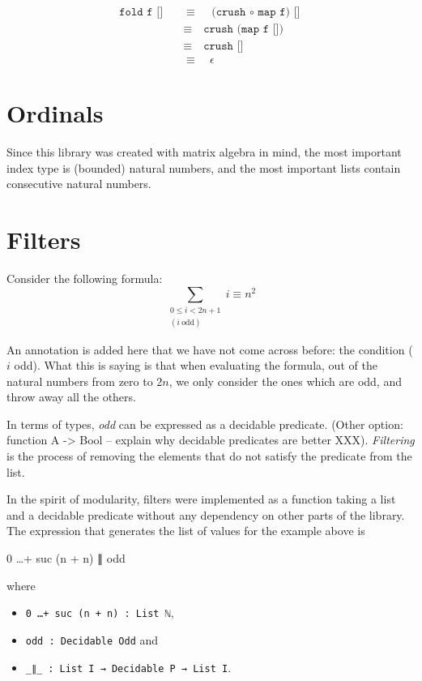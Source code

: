 \begin{align*}
\texttt{fold f []}
\quad&\equiv\quad \texttt{(crush \(\circ\) map f) []} \\
\quad&\equiv\quad \texttt{crush (map f [])} \\
\quad&\equiv\quad \texttt{crush []} \\
\quad&\equiv\quad \epsilon
\end{align*}

\section{Ordinals}

Since this library was created with matrix algebra in mind, the most important index type is (bounded) natural numbers, and the most important lists contain consecutive natural numbers.

\section{Filters}

Consider the following formula: \[ \sum_{\substack{0 \leq i < 2n+1 \\ (i\ \text{odd})}} i \equiv n^2 \]

An annotation is added here that we have not come across before: the condition (\(i\) odd). What this is saying is that when evaluating the formula, out of the natural numbers from zero to \(2n\), we only consider the ones which are odd, and throw away all the others.

In terms of types, \emph{odd} can be expressed as a decidable predicate. (Other option: function A -> Bool -- explain why decidable predicates are better XXX). \emph{Filtering} is the process of removing the elements that do not satisfy the predicate from the list.

In the spirit of modularity, filters were implemented as a function taking a list and a decidable predicate without any dependency on other parts of the library. The expression that generates the list of values for the example above is

\begin{agdacode}
0 …+ suc (n + n) ∥ odd
\end{agdacode}

where
\begin{itemize}
\item \texttt{0 …+ suc (n + n) : List ℕ},
\item \texttt{odd : Decidable Odd} and
\item \texttt{_∥_ : List I → Decidable P → List I}.
\end{itemize}

